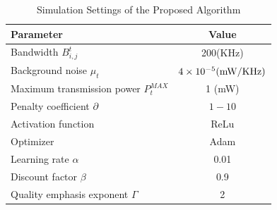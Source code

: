 \documentclass[journal]{IEEEtran}
\begin{document}
\begin{table}[t]
\centering
\caption{Simulation Settings of the Proposed Algorithm}
\label{tab:sim-settings}
\begin{tabular}{l c}
\toprule
\textbf{Parameter} & \textbf{Value} \\
\midrule
Bandwidth $B^t_{i,j}$ & 200(KHz) \\
Background noise $\mu _t$ &  $4 \times {10^{ - 5}}{\rm{(mW}}/{\rm{KHz)}}$ \\
Maximum transmission power $P_t^{MAX}$ & 1 (mW) \\
Penalty coefficient $\partial$  & $1-10$ \\
Activation function  & ReLu \\
Optimizer  & Adam  \\
Learning rate $\alpha$ & 0.01\\
Discount factor  $\beta$ & 0.9 \\
Quality emphasis exponent $\Gamma$ & 2 \\
\bottomrule
\end{tabular}
\end{table}
\end{document}
